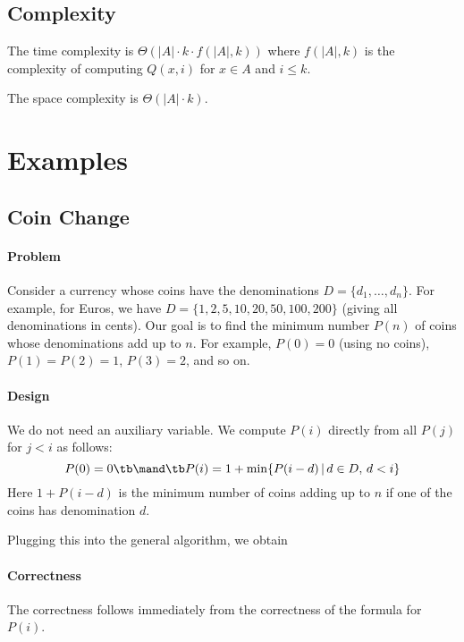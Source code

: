 \subsection{Complexity}
The time complexity is $\Theta(|A|\cdot k\cdot f(|A|,k))$ where $f(|A|,k)$ is the complexity of computing $Q(x,i)$ for $x\in A$ and $i\leq k$.

The space complexity is $\Theta(|A|\cdot k)$.

\section{Examples}

\subsection{Coin Change}

\paragraph{Problem}
Consider a currency whose coins have the denominations $D=\{d_1,\ldots,d_n\}$.
For example, for Euros, we have $D=\{1,2,5,10,20,50,100,200\}$ (giving all denominations in cents).
Our goal is to find the minimum number $P(n)$ of coins whose denominations add up to $n$.
For example, $P(0)=0$ (using no coins), $P(1)=P(2)=1$, $P(3)=2$, and so on.

\paragraph{Design}
We do not need an auxiliary variable.
We compute $P(i)$ directly from all $P(j)$ for $j<i$ as follows:
 \[P(0)=0 \tb\mand\tb P(i)=1+\min \{P(i-d)\,|\,d\in D,\,d<i\}\]
Here $1+P(i-d)$ is the minimum number of coins adding up to $n$ if one of the coins has denomination $d$.

Plugging this into the general algorithm, we obtain

\begin{acode}
\end{acode}

\paragraph{Correctness}
The correctness follows immediately from the correctness of the formula for $P(i)$.

